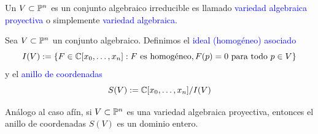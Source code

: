    \begin{definition}
        Un $V\subset\mathbb{P}^n$ es un conjunto algebraico irreducible es llamado \textcolor{blue}{variedad algebraica proyectiva} o simplemente \textcolor{blue}{variedad algebraica}.
    \end{definition}

    \begin{definition}
        Sea $V\subset \mathbb{P}^n$ un conjunto algebraico. Definimos el \textcolor{blue}{ideal (homogéneo) asociado}
        \begin{equation*}
            I(V):=\{F\in\mathbb{C}[x_0,\dots,x_n]:F\text{ es homogéneo},F(p)=0\text{ para todo }p\in V\}
        \end{equation*}
        y el \textcolor{blue}{anillo de coordenadas} 
        \begin{equation*}
            S(V):=\mathbb{C}[x_0,\dots,x_n]/I(V)
        \end{equation*}
    \end{definition}

    \begin{remark}\label{propbasicaproy}
        Análogo al caso afín, si $V\subset\mathbb{P}^n$ es una variedad algebraica proyectiva, entonces el anillo de coordenadas $S(V)$ es un dominio entero.
    \end{remark}
    
